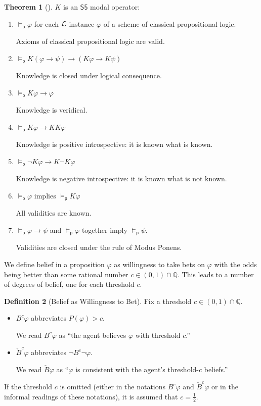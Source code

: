 \documentclass[12pt]{article}
\theoremstyle{definition}
\newtheorem{theorem}{Theorem}[section]
\newtheorem{definition}[theorem]{Definition}
\newcommand{\Rat}{\mathbb{Q}}  %
\newcommand{\Lang}{{\cal L}}   %
\newcommand{\modelsp}{\models_{\mathsf{p}}}                  %
\begin{document}
\begin{theorem}[\cite{Eijck2013:lap}]
  \label{theorem:knowledge}
  $K$ is an $\mathsf{S5}$ modal operator:
  \begin{enumerate}
  \item $\modelsp \varphi$ for each $\Lang$-instance $\varphi$ of a scheme
    of classical propositional logic.

    Axioms of classical propositional logic are valid.

  \item $\modelsp K(\varphi\to\psi)\to(K\varphi\to K\psi)$
    
    Knowledge is closed under logical consequence.

  \item $\modelsp K\varphi\to \varphi$

    Knowledge is veridical.
    
  \item $\modelsp K\varphi\to KK\varphi$

    Knowledge is positive introspective:  it is known what is known.
    
  \item $\modelsp \lnot K\varphi\to K\lnot K\varphi$

    Knowledge is negative introspective: it is known what is not
    known.
    
  \item $\modelsp\varphi$ implies $\modelsp K\varphi$

    All validities are known.

  \item $\modelsp\varphi\to\psi$ and $\modelsp\varphi$ together imply
    $\modelsp\psi$.

    Validities are closed under the rule of Modus Ponens.
  \end{enumerate}
\end{theorem}

We define belief in a proposition $\varphi$ as willingness to take bets
on $\varphi$ with the odds being better than some rational number
$c\in(0,1)\cap\Rat$.  This leads to a number of degrees of belief, one
for each threshold $c$.

\begin{definition}[Belief as Willingness to Bet]
  \label{definition:belief}
  Fix a threshold $c\in(0,1)\cap\Rat$.
  \begin{itemize}
  \item $B^c\varphi$ abbreviates $P(\varphi)>c$.

    We read $B^c\varphi$ as ``the agent believes $\varphi$ with threshold
    $c$.''

  \item $\check B^c\varphi$ abbreviates $\lnot B^c\lnot\varphi$.

    We read $\check B\varphi$ as ``$\varphi$ is consistent with the agent's
    threshold-$c$ beliefs.''
  \end{itemize}
  If the threshold $c$ is omitted (either in the notations $B^c\varphi$
  and $\check B^c\varphi$ or in the informal readings of these
  notations), it is assumed that $c=\frac 12$.
\end{definition}
\end{document}
